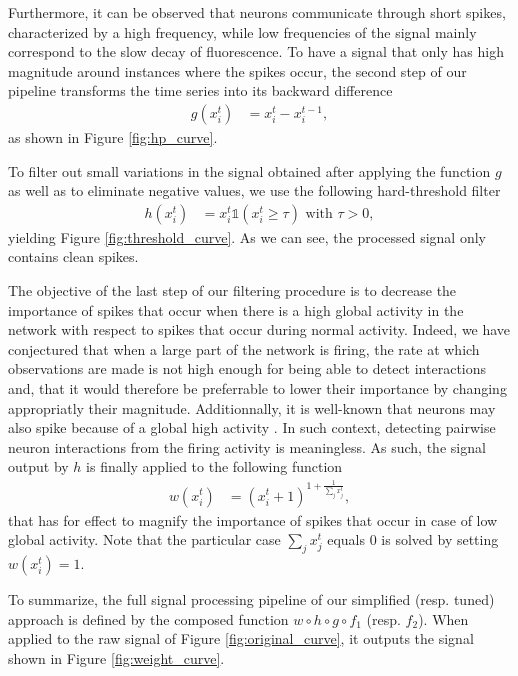 \documentclass[wcp]{jmlr}
\begin{document}
Furthermore, it can be observed that neurons communicate through short spikes, characterized by a high
frequency, while low frequencies of the signal mainly correspond to the slow
decay of fluorescence. To have a signal that only has high magnitude around instances where the spikes occur, the second step of our pipeline transforms the time series into its backward
difference
\begin{align}
g(x^{t}_{i}) &= x^{t}_i - x^{t-1}_i \label{eq:high-pass-filter},
\end{align}
as shown in Figure \ref{fig:hp_curve}.

To filter out small variations in the signal obtained after applying the
function $g$ as well as to eliminate negative values, we use the following
hard-threshold filter
\begin{align}
h(x^{t}_i) &= x^{t}_i \mathbb{1}(x^{t}_i \geq \tau) \text{ with } \tau > 0,
\end{align}
yielding Figure \ref{fig:threshold_curve}.
As we can see, the processed signal only contains clean spikes.

The objective of the last step of our filtering procedure is to decrease the
importance of spikes that occur when there is a high global activity in the
network with respect to  spikes that occur during normal activity. Indeed, we
have conjectured that when a large part of the network is firing, the rate at
which observations are made is not high enough for being able to detect
interactions and, that it would therefore be preferrable to lower their
importance by changing appropriatly their magnitude. Additionnally, it is
well-known that neurons may also spike because of a global high activity
\citep{stetter2012model}. In such  context, detecting pairwise neuron
interactions from the firing activity is meaningless. As such,
the signal output by $h$ is finally applied to the following function
\begin{align}
 w(x^{t}_i) &= (x^{t}_i + 1 )^{1 + \frac{1}{\sum_{j} x^{t}_j}},
\end{align}
that has for effect to magnify the importance of spikes that occur in case of low global activity. Note that the particular case $\sum_{j} x^{t}_j$ equals $0$ is solved by setting $w(x^{t}_i) = 1$.

To summarize, the full signal processing pipeline of our simplified (resp.
tuned) approach is defined by the composed function $w \circ h \circ g \circ
f_1$ (resp. $f_2$). When applied to the raw signal of Figure
\ref{fig:original_curve}, it outputs the signal shown in Figure
\ref{fig:weight_curve}.
\end{document}
